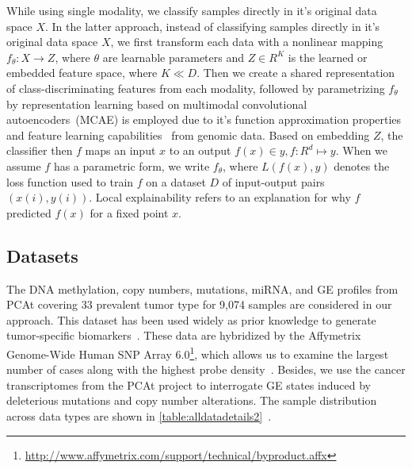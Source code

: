 \hspace*{3.5mm} While using single modality, we classify samples directly in it's original data space $X$. In the latter approach, instead of classifying samples directly in it's original data space $X$, we first transform each data with a nonlinear mapping $f_{\theta}: X \rightarrow Z$, where $\theta$ are learnable parameters and $Z \in {R}^{K}$ is the learned or embedded feature space, where $K \ll D$. Then we create a shared representation of class-discriminating features from each modality, followed by parametrizing $f_{\theta}$ by representation learning based on multimodal convolutional autoencoders~(MCAE) is employed due to it's function approximation properties and feature learning capabilities~\cite{xie2016unsupervised,karim2019drug} from genomic data. Based on embedding $Z$, the classifier then $f$ maps an input $x$ to an output $f(x) \in y, f: {R}^{d} \mapsto y$. When we assume $f$ has a parametric form, we write $f_{\theta}$, where ${L}(f(x), y)$ denotes the loss function used to train $f$ on a dataset $D$ of input-output pairs $(x(i), y(i))$. Local explainability refers to an explanation for why $f$ predicted $f(x)$ for a fixed point $x$. 

\subsection{Datasets}
The DNA methylation, copy numbers, mutations, miRNA, and GE profiles from PCAt covering 33 prevalent tumor type for 9,074 samples are considered in our approach. This dataset has been used widely as prior knowledge to generate tumor-specific biomarkers~\cite{way2018machine,hoadley2018cell,malta2018machine}. These data are hybridized by the Affymetrix Genome-Wide Human SNP Array 6.0\footnote{\url{http://www.affymetrix.com/support/technical/byproduct.affx}}, which allows us to examine the largest number of cases along with the highest probe density~\cite{31Park}. Besides, we use the cancer transcriptomes from the PCAt project to interrogate GE states induced by deleterious mutations and copy number alterations. The sample distribution across data types are shown in \cref{table:alldatadetails2}~\cite{weinstein2013cancer}. 

